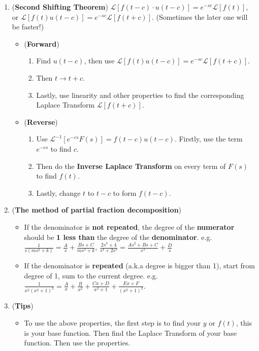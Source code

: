 \documentclass[10pt, landscape]{article}
\begin{document}
\begin{multicols}{4}
\begin{enumerate}
        \item (\textbf{Second Shifting Theorem}) $\mathcal{L}[f(t-c)\cdot u(t-c)]=e^{-sc}\mathcal{L}[f(t)]$, or $\mathcal{L}[f(t)u(t-c)]=e^{-sc}\mathcal{L}[f(t+c)]$. (Sometimes the later one will be faster!)
    \begin{itemize}
        \item (\textbf{Forward})
        \begin{enumerate}
            \item Find $u(t-c)$, then use $\mathcal{L}[f(t)u(t-c)]=e^{-sc}\mathcal{L}[f(t+c)]$.
            \item Then $t\rightarrow t+c$.
            \item Lastly, use linearity and other properties to find the corresponding Laplace Transform $\mathcal{L}[f(t+c)]$.
        \end{enumerate}
        \item (\textbf{Reverse})
        \begin{enumerate}
            \item Use $\mathcal{L}^{-1}[e^{-cs}F(s)]=f(t-c)u(t-c)$. Firstly, use the term $e^{-cs}$ to find $c$.
            \item Then do the \textbf{Inverse Laplace Transform} on every term of $F(s)$ to find $f(t)$.
            \item Lastly, change $t$ to $t-c$ to form $f(t-c)$.
        \end{enumerate} 
    \end{itemize}
    \item (\textbf{The method of partial fraction decomposition})
    \begin{itemize}
        \item If the denominator is \textbf{not repeated}, the degree of the \textbf{numerator} should be \textbf{1 less than} the degree of the \textbf{denominator}. e.g. $\frac{1}{s(ms^2+k)}=\frac{A}{s}+\frac{Bs+C}{ms^2+k}$, $\frac{2s^3+4}{s^4+2s^3}=\frac{As^2+Bs+C}{s^3}+\frac{D}{s}$
        \item If the denominator is \textbf{repeated} (a.k.a degree is bigger than 1), start from degree of 1, sum to the current degree. e.g. $\frac{1}{x^2(x^2+1)^2}=\frac{A}{x}+\frac{B}{x^2}+\frac{Cx+D}{x^2+1}+\frac{Ex+F}{(x^2+1)^2}$.
    \end{itemize}
    \item (\textbf{Tips})
    \begin{itemize}
        \item To use the above properties, the first step is to find your $y\text{ or }f(t)$, this is your base function. Then find the Laplace Transform of your base function. Then use the properties.

\end{itemize}
\end{enumerate}
\end{multicols}
\end{document}
